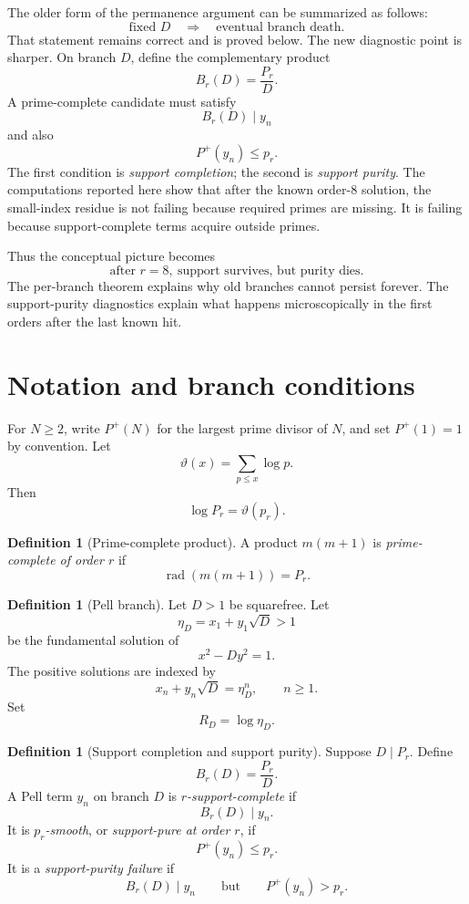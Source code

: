 \documentclass[11pt]{article}
\theoremstyle{definition}
\newtheorem{definition}[theorem]{Definition}
\DeclareMathOperator{\rad}{rad}
\newcommand{\Pplus}{P^{+}}
\newcommand{\thetafun}{\vartheta}
\begin{document}
The older form of the permanence argument can be summarized as follows:
\[
  \text{fixed }D \quad \Longrightarrow \quad \text{eventual branch death.}
\]
That statement remains correct and is proved below.  The new diagnostic point is
sharper.  On branch $D$, define the complementary product
\[
  B_r(D)=\frac{P_r}{D}.
\]
A prime-complete candidate must satisfy
\[
  B_r(D)\mid y_n
\]
and also
\[
  \Pplus(y_n)\le p_r.
\]
The first condition is \emph{support completion}; the second is \emph{support
purity}.  The computations reported here show that after the known order-$8$
solution, the small-index residue is not failing because required primes are
missing.  It is failing because support-complete terms acquire outside primes.

Thus the conceptual picture becomes
\[
  \boxed{\text{after }r=8,\ \text{support survives, but purity dies.}}
\]
The per-branch theorem explains why old branches cannot persist forever.  The
support-purity diagnostics explain what happens microscopically in the first
orders after the last known hit.

\section{Notation and branch conditions}

For $N\ge 2$, write $\Pplus(N)$ for the largest prime divisor of $N$, and set
$\Pplus(1)=1$ by convention.  Let
\[
  \thetafun(x)=\sum_{p\le x}\log p.
\]
Then
\[
  \log P_r=\thetafun(p_r).
\]

\begin{definition}[Prime-complete product]
A product $m(m+1)$ is \emph{prime-complete of order $r$} if
\[
  \rad(m(m+1))=P_r.
\]
\end{definition}

\begin{definition}[Pell branch]
Let $D>1$ be squarefree.  Let
\[
  \eta_D=x_1+y_1\sqrt D>1
\]
be the fundamental solution of
\[
  x^2-Dy^2=1.
\]
The positive solutions are indexed by
\[
  x_n+y_n\sqrt D=\eta_D^n,
  \qquad n\ge1.
\]
Set
\[
  R_D=\log \eta_D.
\]
\end{definition}

\begin{definition}[Support completion and support purity]
Suppose $D\mid P_r$.  Define
\[
  B_r(D)=\frac{P_r}{D}.
\]
A Pell term $y_n$ on branch $D$ is \emph{$r$-support-complete} if
\[
  B_r(D)\mid y_n.
\]
It is \emph{$p_r$-smooth}, or \emph{support-pure at order $r$}, if
\[
  \Pplus(y_n)\le p_r.
\]
It is a \emph{support-purity failure} if
\[
  B_r(D)\mid y_n
  \qquad\text{but}\qquad
  \Pplus(y_n)>p_r.
\]
\end{definition}
\end{document}
